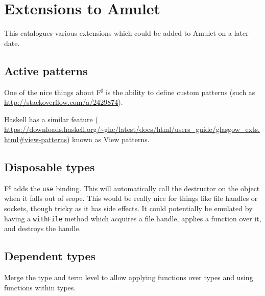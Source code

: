 \section{Extensions to Amulet}

This catalogues various extensions which could be added to Amulet on a later date.

\subsection{Active patterns}
One of the nice things about F$^\sharp$ is the ability to define custom patterns (such as \url{http://stackoverflow.com/a/2429874}). 

Haskell has a similar feature ( \url{https://downloads.haskell.org/~ghc/latest/docs/html/users_guide/glasgow_exts.html\#view-patterns}) known as View patterns.

\subsection{Disposable types}
F$^\sharp$ adds the \texttt{use} binding. This will automatically call the destructor on the object when it falls out of scope. This would be really nice for things like file handles or sockets, though tricky as it has side effects. It could potentially be emulated by having a \texttt{withFile} method which acquires a file handle, applies a function over it, and destroys the handle.

\subsection{Dependent types}
Merge the type and term level to allow applying functions over types and using functions within types.

